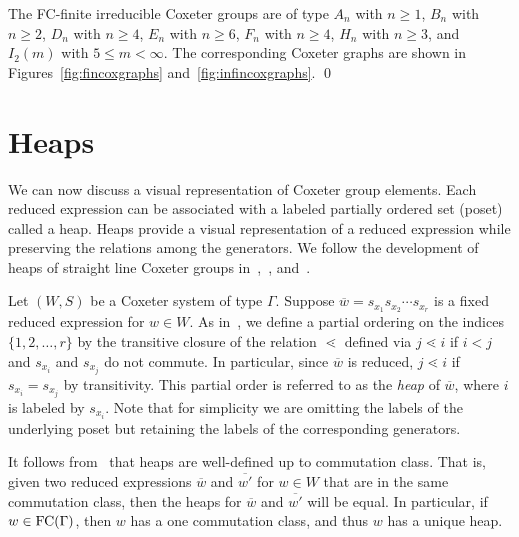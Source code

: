 \begin{theorem}
\label{thm:FCfinite} The FC-finite irreducible Coxeter groups are of type $A_n$ with $n \geq 1$, $B_n$ with $n \geq 2$, $D_n$ with $n \geq 4$, $E_n$ with $n \geq 6$, $F_n$ with $n \geq 4$, $H_n$ with $n \geq 3$, and $I_2(m)$ with $5 \leq m < \infty$. The corresponding Coxeter graphs are shown in Figures~\ref{fig:fincoxgraphs} and~\ref{fig:infincoxgraphs}. \qed
\end{theorem}
  




\section{Heaps}\label{sec:Heaps}

We can now discuss a visual representation of Coxeter group elements. Each reduced expression can be associated with a labeled partially ordered set (poset) called a heap.  Heaps provide a visual representation of a reduced expression while preserving the relations among the generators. We follow the development of heaps of straight line Coxeter groups in~\cite{Billey2007},~\cite{Ernst2010}, and~\cite{Stembridge1996}. 

Let $(W,S)$ be a Coxeter system of type $\Gamma$. Suppose $\overline{w}=s_{x_1}s_{x_2}\cdots s_{x_r}$ is a fixed reduced expression for $w \in W$. As in~\cite{Stembridge1996}, we define a partial ordering on the indices $\{1, 2, \ldots, r\}$ by the transitive closure of the relation $\lessdot$ defined via $j \lessdot i$ if $i < j$ and $s_{x_i}$ and $s_{x_j}$ do not commute. In particular, since $\overline{w}$ is reduced, $j \lessdot i$ if $s_{x_i}=s_{x_j}$ by transitivity. This partial order is referred to as the \emph{heap} of $\overline{w}$, where $i$ is labeled by $s_{x_i}$. Note that for simplicity we are omitting the labels of the underlying poset but retaining the labels of the corresponding generators.

It follows from~\cite{Stembridge1996} that heaps are well-defined up to commutation class. That is, given two reduced expressions $\overline{w}$ and $\overline{w'}$ for $w \in W$ that are in the same commutation class, then the heaps for $\overline{w}$ and $\overline{w'}$ will be equal. In particular, if $w \in \mathrm{FC}(\Gamma)$, then $w$ has a one commutation class, and thus $w$ has a unique heap.

